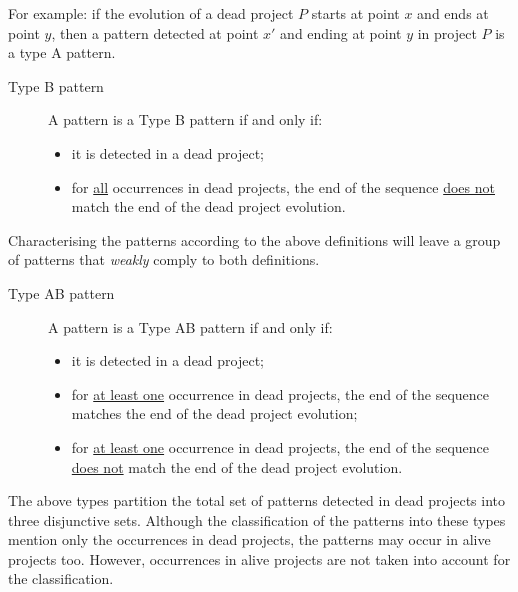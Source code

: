 \vspace{1em}
\noindent
For example: if the evolution of a dead project $P$ starts at point $x$ and ends
at point $y$, then a pattern detected at point $x'$ and ending at point $y$ in
project $P$ is a type A pattern.

\vspace{1em}
\label{def:pattern_typeb}
\begin{description}
	\item[Type B pattern]
		A pattern is a Type B pattern if and only if:
		\begin{itemize}
			\item it is detected in a dead project;
			\item for \underline{all} occurrences in dead projects, the end of the
				sequence \underline{does not} match the end of the dead project evolution.
		\end{itemize}
\end{description}

\vspace{1em}
\noindent
Characterising the patterns according to the above definitions will leave a
group of patterns that \textit{weakly} comply to both definitions.

\vspace{1em}
\label{def:pattern_typeab}
\begin{description}
	\item[Type AB pattern]
		A pattern is a Type AB pattern if and only if:
		\begin{itemize}
			\item it is detected in a dead project;
			\item for \underline{at least one} occurrence in dead projects, the end of
				the sequence matches the end of the dead project evolution;
			\item for \underline{at least one} occurrence in dead projects, the end of
				the sequence \underline{does not} match the end of the dead project
				evolution.
		\end{itemize}
\end{description}

\vspace{1em}
\noindent
The above types partition the total set of patterns detected in dead projects
into three disjunctive sets. Although the classification of the patterns into
these types mention only the occurrences in dead projects, the patterns may
occur in alive projects too. However, occurrences in alive projects are not
taken into account for the classification.

